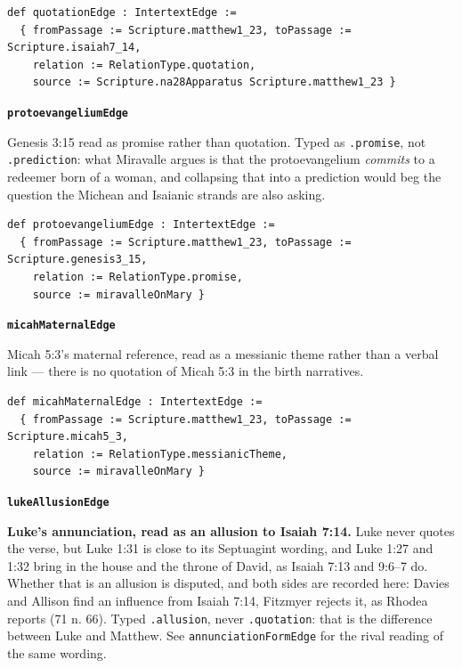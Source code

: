 \documentclass[11pt]{article}
\begin{document}
{\small\begin{verbatim}
def quotationEdge : IntertextEdge :=
  { fromPassage := Scripture.matthew1_23, toPassage := Scripture.isaiah7_14,
    relation := RelationType.quotation,
    source := Scripture.na28Apparatus Scripture.matthew1_23 }
\end{verbatim}}
\par\medskip\noindent\textbf{\texttt{protoevangelium\allowbreak{}Edge}}\par\nobreak\noindent
Genesis 3:15 read as promise rather than quotation. Typed as \texttt{.promise}, not \texttt{.prediction}: what Miravalle argues is that the protoevangelium \emph{commits} to a redeemer born of a woman, and collapsing that into a prediction would beg the question the Michean and Isaianic strands are also asking.

{\small\begin{verbatim}
def protoevangeliumEdge : IntertextEdge :=
  { fromPassage := Scripture.matthew1_23, toPassage := Scripture.genesis3_15,
    relation := RelationType.promise,
    source := miravalleOnMary }
\end{verbatim}}
\par\medskip\noindent\textbf{\texttt{micah\allowbreak{}Maternal\allowbreak{}Edge}}\par\nobreak\noindent
Micah 5:3's maternal reference, read as a messianic theme rather than a verbal link — there is no quotation of Micah 5:3 in the birth narratives.

{\small\begin{verbatim}
def micahMaternalEdge : IntertextEdge :=
  { fromPassage := Scripture.matthew1_23, toPassage := Scripture.micah5_3,
    relation := RelationType.messianicTheme,
    source := miravalleOnMary }
\end{verbatim}}
\par\medskip\noindent\textbf{\texttt{luke\allowbreak{}Allusion\allowbreak{}Edge}}\par\nobreak\noindent
\textbf{Luke's annunciation, read as an allusion to Isaiah 7:14.} Luke never quotes the verse, but Luke 1:31 is close to its Septuagint wording, and Luke 1:27 and 1:32 bring in the house and the throne of David, as Isaiah 7:13 and 9:6–7 do. Whether that is an allusion is disputed, and both sides are recorded here: Davies and Allison find an influence from Isaiah 7:14, Fitzmyer rejects it, as Rhodea reports (71 n. 66). Typed \texttt{.allusion}, never \texttt{.quotation}: that is the difference between Luke and Matthew. See \texttt{annunciation\allowbreak{}Form\allowbreak{}Edge} for the rival reading of the same wording.
\end{document}
